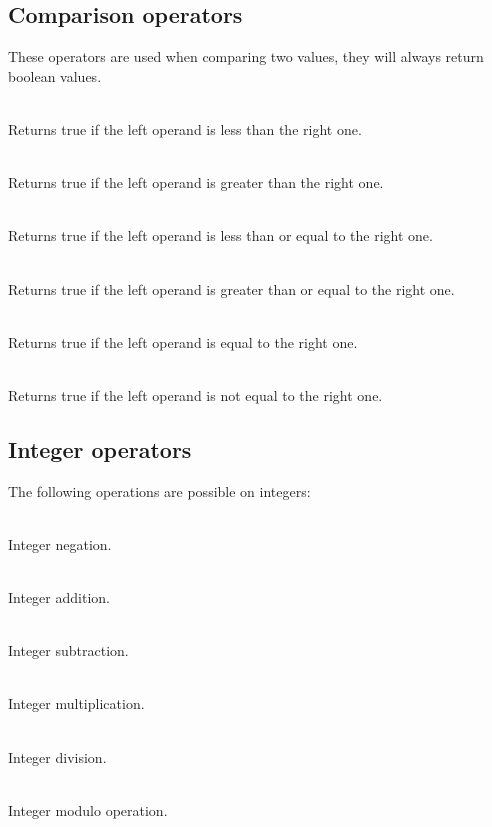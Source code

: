\subsection{Comparison operators}

These operators are used when comparing two values, they will always return
boolean values.
\begin{dlist}
  \item {}\\
    Returns true if the left operand is less than the right one.
  \item {}\\
    Returns true if the left operand is greater than the right one.
  \item {}\\
    Returns true if the left operand is less than or equal to the right one.
  \item {}\\
    Returns true if the left operand is greater than or equal to the right one.
  \item {}\\
    Returns true if the left operand is equal to the right one.
  \item {}\\
    Returns true if the left operand is not equal to the right one.
\end{dlist}

\subsection{Integer operators}

The following operations are possible on integers:
\begin{dlist}
  \item {} \\
    Integer negation.
  \item {} \\
    Integer addition.
  \item {} \\
    Integer subtraction.
  \item {} \\
    Integer multiplication.
  \item {} \\
    Integer division.
  \item {} \\
    Integer modulo operation.
\end{dlist}

